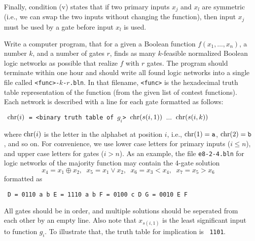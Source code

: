 Finally, condition (v) states that if two primary inputs $x_j$ and
$x_l$ are symmetric (i.e., we can swap the two inputs without changing
the function), then input $x_j$ must be used by a gate before input
$x_l$ is used.

\smallskip{} \enspace Write a computer program, that
for a given a Boolean function $f(x_1, \dots, x_n)$, a number $k$, and
a number of gates $r$, finds as many $k$-feasible normalized Boolean
logic networks as possible that realize $f$ with $r$ gates.  The
program should terminate within one hour and should write all found
logic networks into a single file called {\tt <func>-$k$-$r$.bln}.  In
that filename, {\tt <func>} is the hexadecimal truth table
representation of the function (from the given list of contest
functions).  Each network is described with a line for each gate
formatted as follows:

\medskip
\bgroup
\parindent=40pt
\tt\obeylines
${\rm chr}(i)$ = <binary truth table of $g_i$> ${\rm chr}(s(i,1))$ $\dots$ ${\rm chr}(s(i,k))$
\egroup

\medskip\noindent where ${\rm chr}(i)$ is the letter in the alphabet
at position $i$, i.e., ${\rm chr}(1) = {\tt a}$, ${\rm chr}(2) = {\tt
b}$, and so on.  For convenience, we use lower case letters for
primary inputs ($i \le n$), and upper case letters for gates ($i >
n$).  As an example, the file {\tt e8-2-4.bln} for logic networks of the majority function may contain the 4-gate solution
%
$$
x_4 = x_1 \oplus x_2,\;\; x_5 = x_1 \lor x_2,\;\; x_6 = x_3 < x_4,\;\; x_7 = x_5 > x_6
$$
%
formatted as

\medskip
\bgroup
\parindent=40pt
\parskip=0pt
\baselineskip=12pt
\tt\obeylines
D = 0110 a b
E = 1110 a b
F = 0100 c D
G = 0010 E F
\egroup

\smallskip\noindent All gates should be in order, and multiple
solutions should be seperated from each other by an empty line.  Also
note that $x_{s(i,1)}$ is the least significant input to function
$g_i$.  To illustrate that, the truth table for implication is {\tt
1101}.

\bye
